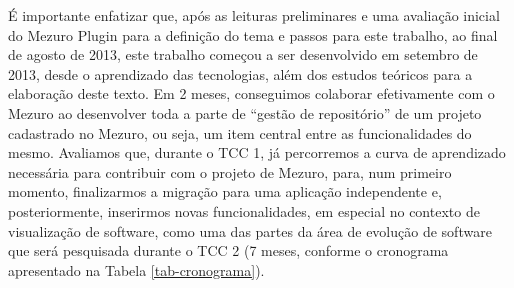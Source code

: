 É importante enfatizar que, após as leituras preliminares e uma avaliação inicial do Mezuro Plugin para a definição do tema e passos para este trabalho, ao final de agosto de 2013, este trabalho começou a ser desenvolvido em setembro de 2013, desde o aprendizado das tecnologias, além dos estudos teóricos para a elaboração deste texto.
%
Em 2 meses, conseguimos colaborar efetivamente com o Mezuro ao desenvolver toda a parte de ``gestão de repositório'' de um projeto cadastrado no Mezuro, ou seja, um item central entre as funcionalidades do mesmo.
%
Avaliamos que, durante o TCC 1, já percorremos a curva de aprendizado necessária para contribuir com o projeto de Mezuro, para, num primeiro momento, finalizarmos a migração para uma aplicação independente e, posteriormente, inserirmos novas funcionalidades, em especial no contexto de visualização de software, como uma das partes da área de evolução de software que será pesquisada durante o TCC 2 (7 meses, conforme o cronograma apresentado na Tabela \ref{tab-cronograma}).



